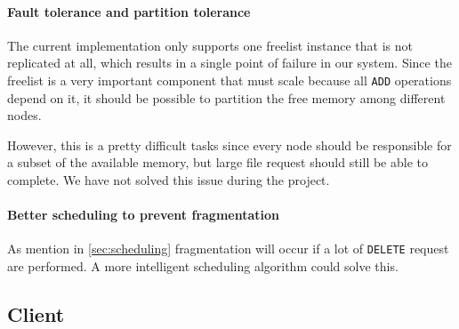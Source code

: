\documentclass[12pt,a4paper]{scrartcl}
\begin{document}
\paragraph{Fault tolerance and partition tolerance}
The current implementation only supports one freelist instance that is not replicated at all, which results in a single point of failure in our system. Since the freelist is a very important component that must scale because all \verb|ADD| operations depend on it, it should be possible to partition the free memory among different nodes.

However, this is a pretty difficult tasks since every node should be responsible for a subset of the available memory, but large file request should still be able to complete. We have not solved this issue during the project.

\paragraph{Better scheduling to prevent fragmentation}
As mention in \autoref{sec:scheduling} fragmentation will occur if a lot of \verb|DELETE| request are performed. A more intelligent scheduling algorithm could solve this.

\subsection{Client}





\nocite{*}
\end{document}
